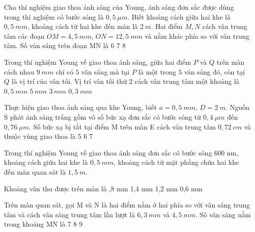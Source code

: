 \begin{ex}
Cho thí nghiệm giao thoa ánh sáng của Young, ánh sáng đơn sắc được dùng trong thí nghiệm có bước sóng là $0,5\  \mu m$. Biết khoảng cách giữa hai khe là $0,5\ mm$, khoảng cách từ hai khe đến màn là $2\ m$. Hai điểm $M, N$ cách vân trung tâm các đoạn $OM = 4,5\ mm$, $ON = 12,5\ mm$ và nằm khác phía so với vân trung tâm. Số vân sáng trên đoạn MN là
\choice
{6}
{7}
{8}
{}
\end{ex}
\begin{ex}
Trong thí nghiệm Young về giao thoa ánh sáng, giữa hai điểm $P$ và $Q$ trên màn cách nhau $9\ mm$ chỉ có $5$ vân sáng mà tại $P$ là một trong $5$ vân sáng đó, còn tại $Q$ là vị trí của vân tối. Vị trí vân tối thứ $2$ cách vân trung tâm một khoảng là
\choice
{$0,5\ mm$}
{$5\ mm$}
{\True $3\ mm$}
{$0,3\ mm$}
\loigiai{}
\end{ex}
\begin{ex}
Thực hiện giao thoa ánh sáng qua khe Young, biết $a = 0,5\ mm$, $D = 2\ m$. Nguồn S phát ánh sáng trắng gồm vô số bức xạ đơn sắc có bước sóng từ $0,4\ \mu m$ đến $0,76\ \mu m$. Số bức xạ bị tắt tại điểm M trên màn E cách vân trung tâm $0,72\  cm$ và thuộc vùng giao thoa là
\choice
{}
{5}
{6}
{7}
\end{ex}
\begin{ex}
Trong thí nghiệm Young về giao thoa ánh sáng đơn sắc có bước sóng 600 nm, khoảng cách giữa hai khe là $0,5\ mm$, khoảng cách từ mặt phẳng chứa hai khe đến màn quan sát là $1,5\ m$.
\begin{chc}
Khoảng vân thu được trên màn là 
\choice
{,8 mm}
{1,4 mm}
{1,2 mm}
{0,6 mm}
\loigiai{  }
\end{chc}
\begin{chc}
Trên màn quan sát, gọi M và N là hai điểm nằm ở hai phía so với vân sáng trung tâm và cách vân sáng trung tâm lần lượt là $6,3\ mm$ và $4,5\ mm$. Số vân sáng nằm trong khoảng MN là
\choice
{}
{7}
{8}
{9}
\loigiai{  }
\end{chc}
\end{ex}


























